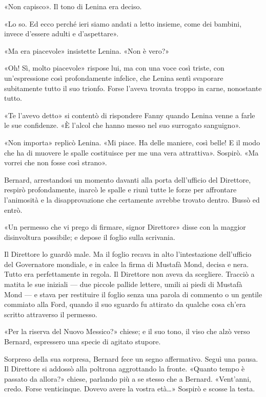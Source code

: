 \documentclass[
a5paper, %
10pt, %
twoside, 
onecolumn, %
openany, %
]{memoir}
\begin{document}
«Non capisco». Il tono di Lenina era deciso.

«Lo so. Ed ecco perché ieri siamo andati a letto insieme, come dei bambini, invece d’essere adulti e d’aspettare».

«Ma era piacevole» insistette Lenina. «Non è vero?»

«Oh! Sì, molto piacevole» rispose lui, ma con una voce così triste, con un’espressione così profondamente infelice, che Lenina sentì svaporare subitamente tutto il suo trionfo. Forse l’aveva trovata troppo in carne, nonostante tutto.

«Te l’avevo detto» si contentò di rispondere Fanny quando Lenina venne a farle le sue confidenze. «È l’alcol che hanno messo nel suo surrogato sanguigno».

«Non importa» replicò Lenina. «Mi piace. Ha delle maniere, così belle! E il modo che ha di muovere le spalle costituisce per me una vera attrattiva». Sospirò. «Ma vorrei che non fosse così strano».

\newpage 

\begin{center}
    {\huge\textbf{}}
\end{center}

Bernard, arrestandosi un momento davanti alla porta dell’ufficio del Direttore, respirò profondamente, inarcò le spalle e riunì tutte le forze per affrontare l’animosità e la disapprovazione che certamente avrebbe trovato dentro. Bussò ed entrò.

«Un permesso che vi prego di firmare, signor Direttore» disse con la maggior disinvoltura possibile; e depose il foglio sulla scrivania.

Il Direttore lo guardò male. Ma il foglio recava in alto l’intestazione dell’ufficio del Governatore mondiale, e in calce la firma di Mustafà Mond, decisa e nera. Tutto era perfettamente in regola. Il Direttore non aveva da scegliere. Tracciò a matita le sue iniziali — due piccole pallide lettere, umili ai piedi di Mustafà Mond — e stava per restituire il foglio senza una parola di commento o un gentile commiato alla Ford, quando il suo sguardo fu attirato da qualche cosa ch’era scritto attraverso il permesso.

«Per la riserva del Nuovo Messico?» chiese; e il suo tono, il viso che alzò verso Bernard, espressero una specie di agitato stupore.

Sorpreso della sua sorpresa, Bernard fece un segno affermativo. Seguì una pausa. Il Direttore si addossò alla poltrona aggrottando la fronte. «Quanto tempo è passato da allora?» chiese, parlando più a se stesso che a Bernard. «Vent’anni, credo. Forse venticinque. Dovevo avere la vostra età…» Sospirò e scosse la testa.
\end{document}
